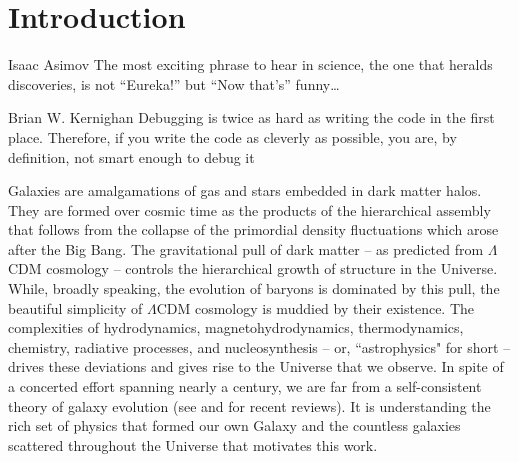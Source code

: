 \chapter[Introduction]{Introduction}
\label{ch:intro}
\vspace{-16pt}
\begin{chapquote}{Isaac Asimov} \singlespacing The most exciting phrase to hear in science, the one that heralds discoveries, is not ``Eureka!'' but ``Now that's'' funny…
\end{chapquote} \vspace{-8pt}
\begin{chapquote}{Brian W. Kernighan} \singlespacing Debugging is twice as hard as writing the code in the first place. Therefore, if you write the code as cleverly as possible, you are, by definition, not smart enough to debug it
\end{chapquote} \vspace{-8pt}

\noindent\makebox[\linewidth]{\rule{0.5\textwidth}{0.5pt}} \vspace{1pt}

\newcommand{\code}{\textsc}
\newcommand{\Hmolecular}{H$_2$}

%
Galaxies are amalgamations of gas and stars embedded in dark matter halos. They are formed over cosmic time as the products of the hierarchical assembly that follows from the collapse of the primordial density fluctuations which arose after the Big Bang. The gravitational pull of dark matter -- as predicted from $\Lambda$CDM cosmology -- controls the hierarchical growth of structure in the Universe. While, broadly speaking, the evolution of baryons is dominated by this pull, the beautiful simplicity of $\Lambda$CDM cosmology is muddied by their existence. The complexities of hydrodynamics, magnetohydrodynamics, thermodynamics, chemistry, radiative processes, and nucleosynthesis -- or, ``astrophysics" for short -- drives these deviations and gives rise to the Universe that we observe. In spite of a concerted effort spanning nearly a century, we are far from a self-consistent theory of galaxy evolution (see \citet{SomervilleDave2015} and \cite{NaabOstriker2017} for recent reviews). It is understanding the rich set of physics that formed our own Galaxy and the countless galaxies scattered throughout the Universe that motivates this work.

